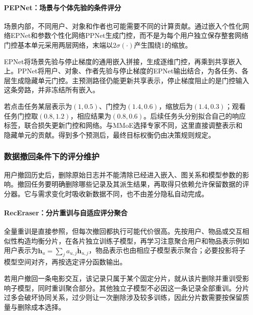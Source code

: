 \paragraph{PEPNet：场景与个体先验的条件评分}
\label{sec:rs-pepnet}

场景内部，不同用户、对象和作者也可能需要不同的计算贡献。通过嵌入个性化网络EPNet和参数个性化网络PPNet生成门控，而不是为每个用户独立保存整套网络门控基本单元采用两层网络，末端以$2\sigma(\cdot)$产生围绕1的缩放。

EPNet将场景先验与停止梯度的通用嵌入拼接，生成逐维门控，再乘到共享嵌入上。PPNet将用户、对象、作者先验与停止梯度的EPNet输出结合，为各任务、各层生成隐藏单元门控。主预测路径仍能更新共享表示，停止梯度阻止的是门控输入这条旁路，并非冻结所有嵌入。

若点击任务某层表示为$(1,0.5)$、门控为$(1.4,0.6)$，缩放后为$(1.4,0.3)$；观看任务门控取$(0.8,1.2)$，相应结果为$(0.8,0.6)$。后续任务头分别拟合自己的响应标签，联合损失更新门控和网络。与MMoE选择专家不同，这里直接调整表示和隐藏单元的贡献。得到多个预测后，最终目标权衡仍由决策规则规定。

\subsubsection{数据撤回条件下的评分维护}
\label{sec:rs-unlearning-maintenance}

用户撤回历史后，删除原始日志并不能清除已经进入嵌入、图关系和模型参数的影响。撤回任务要明确删除哪些记录及其派生结果，再取得只依赖允许保留数据的评分器。它与需求变化时吸收新数据不同，也不由差分隐私自动完成。

\paragraph{RecEraser：分片重训与自适应评分聚合}
\label{sec:rs-receraser}

全量重训是直接参照，但每次撤回都执行可能代价很高。先按用户、物品或交互相似性构造均衡分片，在各片独立训练子模型，再学习注意聚合用户和物品表示例如用户表示为$\bm h_u=\sum_j a_{u,j}\widetilde{\bm h}_{u,j}$，物品表示也由相应子模型表示聚合；必要投影将子模型空间对齐，再按选定评分函数输出。

若用户撤回一条电影交互，该记录只属于某个固定分片，就从该片删除并重训受影响子模型，同时重训聚合部分。其他独立子模型不必因这一条记录全部重训。分片过多会破坏协同关系，过少则让一次删除涉及较多训练，因此分片数需要按保留质量与删除成本选择。

